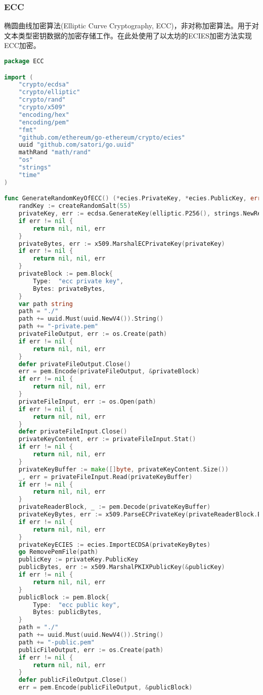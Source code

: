 \documentclass[UTF8]{ctexart}
\begin{document}
    \subsubsection{ECC}
    \par
    椭圆曲线加密算法(Elliptic Curve Cryptography, ECC)，非对称加密算法。用于对文本类型密钥数据的加密存储工作。在此处使用了以太坊的ECIES加密方法实现ECC加密。
    \begin{lstlisting}[language=Go]
package ECC

import (
	"crypto/ecdsa"
	"crypto/elliptic"
	"crypto/rand"
	"crypto/x509"
	"encoding/hex"
	"encoding/pem"
	"fmt"
	"github.com/ethereum/go-ethereum/crypto/ecies"
	uuid "github.com/satori/go.uuid"
	mathRand "math/rand"
	"os"
	"strings"
	"time"
)

func GenerateRandomKeyOfECC() (*ecies.PrivateKey, *ecies.PublicKey, error) {
	randKey := createRandomSalt(55)
	privateKey, err := ecdsa.GenerateKey(elliptic.P256(), strings.NewReader(randKey))
	if err != nil {
		return nil, nil, err
	}
	privateBytes, err := x509.MarshalECPrivateKey(privateKey)
	if err != nil {
		return nil, nil, err
	}
	privateBlock := pem.Block{
		Type:  "ecc private key",
		Bytes: privateBytes,
	}
	var path string
	path = "./"
	path += uuid.Must(uuid.NewV4()).String()
	path += "-private.pem"
	privateFileOutput, err := os.Create(path)
	if err != nil {
		return nil, nil, err
	}
	defer privateFileOutput.Close()
	err = pem.Encode(privateFileOutput, &privateBlock)
	if err != nil {
		return nil, nil, err
	}
	privateFileInput, err := os.Open(path)
	if err != nil {
		return nil, nil, err
	}
	defer privateFileInput.Close()
	privateKeyContent, err := privateFileInput.Stat()
	if err != nil {
		return nil, nil, err
	}
	privateKeyBuffer := make([]byte, privateKeyContent.Size())
	_, err = privateFileInput.Read(privateKeyBuffer)
	if err != nil {
		return nil, nil, err
	}
	privateReaderBlock, _ := pem.Decode(privateKeyBuffer)
	privateKeyBytes, err := x509.ParseECPrivateKey(privateReaderBlock.Bytes)
	if err != nil {
		return nil, nil, err
	}
	privateKeyECIES := ecies.ImportECDSA(privateKeyBytes)
	go RemovePemFile(path)
	publicKey := privateKey.PublicKey
	publicBytes, err := x509.MarshalPKIXPublicKey(&publicKey)
	if err != nil {
		return nil, nil, err
	}
	publicBlock := pem.Block{
		Type:  "ecc public key",
		Bytes: publicBytes,
	}
	path = "./"
	path += uuid.Must(uuid.NewV4()).String()
	path += "-public.pem"
	publicFileOutput, err := os.Create(path)
	if err != nil {
		return nil, nil, err
	}
	defer publicFileOutput.Close()
	err = pem.Encode(publicFileOutput, &publicBlock)

\end{lstlisting}
\end{document}
